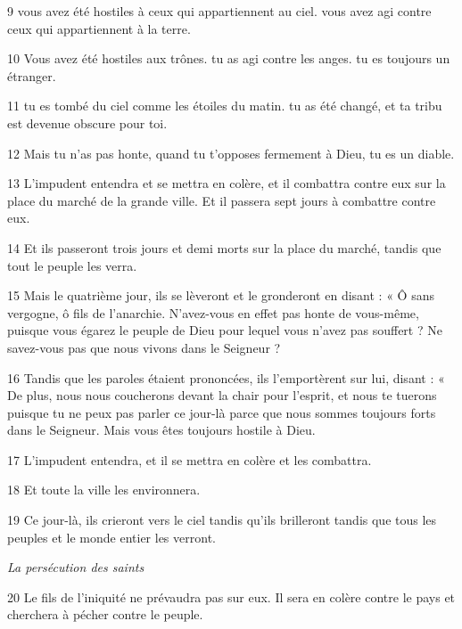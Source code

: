 \par 9 vous avez été hostiles à ceux qui appartiennent au ciel. vous avez agi contre ceux qui appartiennent à la terre.

\par 10 Vous avez été hostiles aux trônes. tu as agi contre les anges. tu es toujours un étranger.

\par 11 tu es tombé du ciel comme les étoiles du matin. tu as été changé, et ta tribu est devenue obscure pour toi.

\par 12 Mais tu n'as pas honte, quand tu t'opposes fermement à Dieu, tu es un diable.

\par 13 L'impudent entendra et se mettra en colère, et il combattra contre eux sur la place du marché de la grande ville. Et il passera sept jours à combattre contre eux.

\par 14 Et ils passeront trois jours et demi morts sur la place du marché, tandis que tout le peuple les verra.

\par 15 Mais le quatrième jour, ils se lèveront et le gronderont en disant : « Ô sans vergogne, ô fils de l'anarchie. N'avez-vous en effet pas honte de vous-même, puisque vous égarez le peuple de Dieu pour lequel vous n'avez pas souffert ? Ne savez-vous pas que nous vivons dans le Seigneur ?

\par 16 Tandis que les paroles étaient prononcées, ils l'emportèrent sur lui, disant : « De plus, nous nous coucherons devant la chair pour l'esprit, et nous te tuerons puisque tu ne peux pas parler ce jour-là parce que nous sommes toujours forts dans le Seigneur. Mais vous êtes toujours hostile à Dieu.

\par 17 L'impudent entendra, et il se mettra en colère et les combattra.

\par 18 Et toute la ville les environnera.

\par 19 Ce jour-là, ils crieront vers le ciel tandis qu'ils brilleront tandis que tous les peuples et le monde entier les verront.


\par \textit{La persécution des saints}

\par 20 Le fils de l'iniquité ne prévaudra pas sur eux. Il sera en colère contre le pays et cherchera à pécher contre le peuple.

